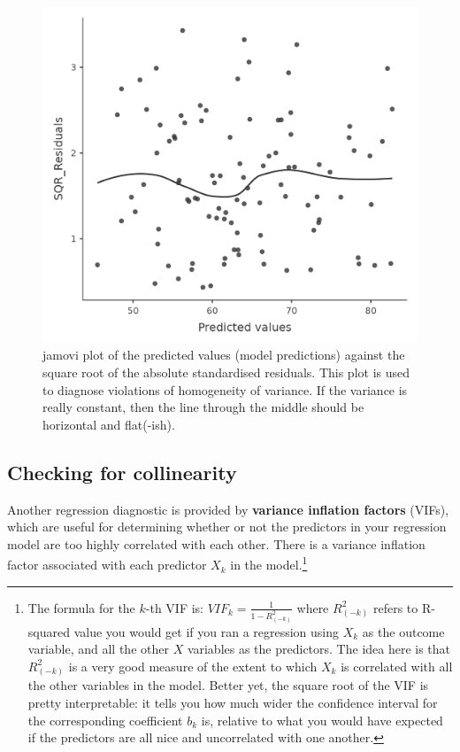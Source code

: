 \documentclass[
  a4paper,
]{book}
\begin{document}
\begin{figure}

\includegraphics[width=1\textwidth,height=\textheight]{images/fig12-21.png} \hfill{}

\caption{\label{fig-fig12-21}jamovi plot of the predicted values (model
predictions) against the square root of the absolute standardised
residuals. This plot is used to diagnose violations of homogeneity of
variance. If the variance is really constant, then the line through the
middle should be horizontal and flat(-ish).}

\end{figure}

\hypertarget{checking-for-collinearity}{%
\subsection{Checking for collinearity}\label{checking-for-collinearity}}

Another regression diagnostic is provided by \textbf{variance inflation
factors} (VIFs), which are useful for determining whether or not the
predictors in your regression model are too highly correlated with each
other. There is a variance inflation factor associated with each
predictor \(X_k\) in the model.\footnote{The formula for the \(k\)-th
  VIF is: \(VIF_k=\frac{1}{1-R^2_{(-k)}}\) where \(R^2_{(-k)}\) refers
  to R-squared value you would get if you ran a regression using \(X_k\)
  as the outcome variable, and all the other \(X\) variables as the
  predictors. The idea here is that \(R^2_{(-k)}\) is a very good
  measure of the extent to which \(X_k\) is correlated with all the
  other variables in the model. Better yet, the square root of the VIF
  is pretty interpretable: it tells you how much wider the confidence
  interval for the corresponding coefficient \(b_k\) is, relative to
  what you would have expected if the predictors are all nice and
  uncorrelated with one another.}
\end{document}
